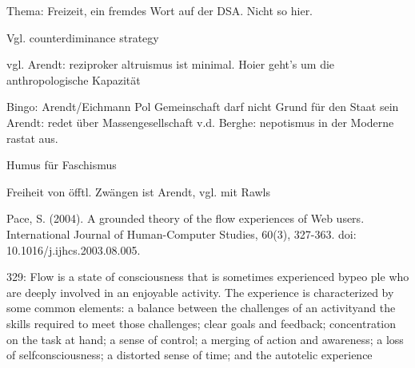 Thema: Freizeit, ein fremdes Wort auf der DSA. Nicht so hier.

Vgl. counterdiminance strategy 

vgl. Arendt: reziproker altruismus ist minimal. Hoier geht's um die anthropologische Kapazität

Bingo: Arendt/Eichmann Pol Gemeinschaft darf nicht Grund für den Staat sein
Arendt: redet über Massengesellschaft
v.d. Berghe: nepotismus in der Moderne rastat aus.

Humus für Faschismus

Freiheit von öfftl. Zwängen ist Arendt, vgl. mit Rawls


Pace, S. (2004). A grounded theory of the flow experiences of Web users. International Journal of Human-Computer Studies, 60(3), 327-363. doi: 10.1016/j.ijhcs.2003.08.005.

329: Flow is a state of consciousness that is sometimes experienced bypeo ple who are
deeply involved in an enjoyable activity. The experience is characterized by some
common elements: a balance between the challenges of an activityand the skills
required to meet those challenges; clear goals and feedback; concentration on the
task at hand; a sense of control; a merging of action and awareness; a loss of selfconsciousness;
a distorted sense of time; and the autotelic experience
 



